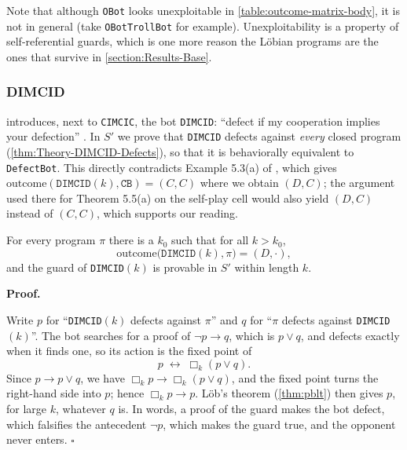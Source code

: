 \documentclass[twoside,11pt]{article}
\renewcommand{\BlackBox}{\ensuremath{\square}}
\renewenvironment{proof}[1][Proof]{%
  \par\noindent\textbf{#1.}\enspace\ignorespaces
}{%
  \ifhmode\unskip\nobreak\hfill\quad\else\noindent\hfill\fi
  \BlackBox\par\addvspace{2mm}%
}
\begin{document}
Note that although \texttt{OBot} looks unexploitable in \cref{table:outcome-matrix-body}, it is not in general (take \texttt{OBotTrollBot} for example). Unexploitability is a property of self-referential guards, which is one more reason the Löbian programs are the ones that survive in \cref{section:Results-Base}.


\subsubsection{DIMCID}
\label{apx-subsubsection:Theory-AddResultsCritch-DIMCID}

\citet{Critch} introduces, next to \texttt{CIMCIC}, the bot \texttt{DIMCID}: \enquote{defect if my cooperation implies your defection} \citep[\S5.2]{Critch}. In $S'$ we prove that \texttt{DIMCID} defects against \emph{every} closed program (\cref{thm:Theory-DIMCID-Defects}), so that it is behaviorally equivalent to \texttt{DefectBot}. This directly contradicts Example 5.3(a) of \citet{Critch}, which gives $\mathrm{outcome}(\texttt{DIMCID}(k), \texttt{CB}) = (C,C)$ where we obtain $(D,C)$; the argument used there for Theorem 5.5(a) on the self-play cell would also yield $(D,C)$ instead of $(C,C)$, which supports our reading.

\begin{theorem}\label{thm:Theory-DIMCID-Defects}
For every program $\pi$ there is a $k_0$ such that for all $k > k_0$,
\[
  \mathrm{outcome}\bigl(\texttt{DIMCID}(k), \pi\bigr) = (D, \cdot),
\]
and the guard of \texttt{DIMCID}$(k)$ is provable in $S'$ within length $k$.
\end{theorem}

\begin{proof}
Write $p$ for \enquote{\texttt{DIMCID}$(k)$ defects against $\pi$} and $q$ for \enquote{$\pi$ defects against \texttt{DIMCID}$(k)$}. The bot searches for a proof of $\neg p \to q$, which is $p \vee q$, and defects exactly when it finds one, so its action is the fixed point of
\[
  p \;\leftrightarrow\; \Box_k (p \vee q).
\]
Since $p \to p \vee q$, we have $\Box_k p \to \Box_k(p \vee q)$, and the fixed point turns the right-hand side into $p$; hence $\Box_k p \to p$. Löb's theorem (\cref{thm:pblt}) then gives $p$, for large $k$, whatever $q$ is. In words, a proof of the guard makes the bot defect, which falsifies the antecedent $\neg p$, which makes the guard true, and the opponent never enters.
\end{proof}
\end{document}
